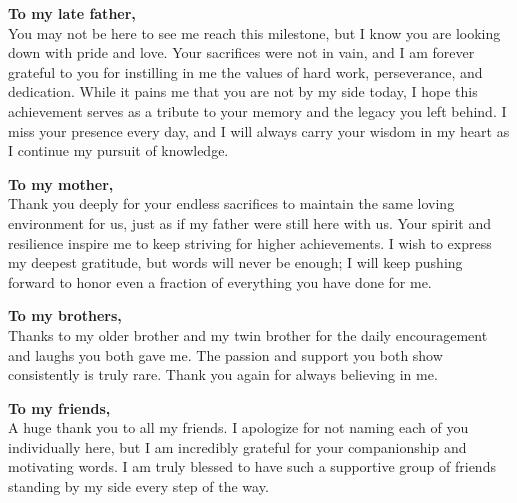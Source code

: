 \thispagestyle{empty} %

\begin{itshape}
\raggedright

\noindent \textbf{\large To my late father,} \\
\vspace{0.5em}
\hspace{1.5em} You may not be here to see me reach this milestone, but I know you are looking down with pride and love. Your sacrifices were not in vain, and I am forever grateful to you for instilling in me the values of hard work, perseverance, and dedication. While it pains me that you are not by my side today, I hope this achievement serves as a tribute to your memory and the legacy you left behind. I miss your presence every day, and I will always carry your wisdom in my heart as I continue my pursuit of knowledge.

\vspace{2em}

\noindent \textbf{\large To my mother,} \\
\vspace{0.5em}
\hspace{1.5em} Thank you deeply for your endless sacrifices to maintain the same loving environment for us, just as if my father were still here with us. Your spirit and resilience inspire me to keep striving for higher achievements. I wish to express my deepest gratitude, but words will never be enough; I will keep pushing forward to honor even a fraction of everything you have done for me.

\vspace{2em}

\noindent \textbf{\large To my brothers,} \\
\vspace{0.5em}
\hspace{1.5em} Thanks to my older brother and my twin brother for the daily encouragement and laughs you both gave me. The passion and support you both show consistently is truly rare. Thank you again for always believing in me.

\vspace{2em}

\noindent \textbf{\large To my friends,} \\
\vspace{0.5em}
\hspace{1.5em} A huge thank you to all my friends. I apologize for not naming each of you individually here, but I am incredibly grateful for your companionship and motivating words. I am truly blessed to have such a supportive group of friends standing by my side every step of the way.


\end{itshape}
